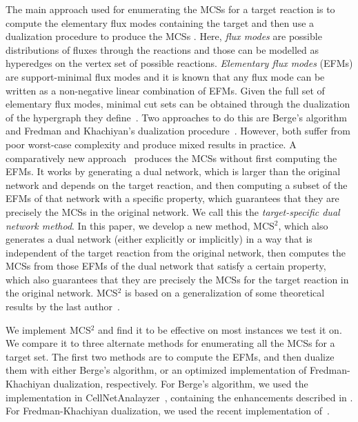 \documentclass{bioinfo}
\theoremstyle{plain}
\theoremstyle{definition}
\begin{document}
The main approach used for enumerating the MCSs for a target reaction is to compute the elementary flux modes containing the target and then use a dualization procedure to produce the MCSs \cite{MHS-survey}.  %
Here, \emph{flux modes} are possible distributions of fluxes through the reactions and those can be modelled as hyperedges on the vertex set of possible reactions. \emph{Elementary flux modes} (EFMs) are support-minimal flux modes and it is known that any flux mode can be written as a non-negative linear combination of EFMs. Given the full set of elementary flux modes, minimal cut sets can be obtained through the dualization of the hypergraph they define~\cite{MCS,Stephen}. Two approaches to do this are Berge's algorithm~\cite{Berge} and Fredman and Khachiyan's dualization procedure~\cite{FK}. However, both suffer from poor worst-case complexity and produce mixed results in practice. A comparatively new approach~\cite{Duality} produces the MCSs without first computing the EFMs. It works by generating a dual network, which is larger than the original network and depends on the target reaction, and then computing a subset of the EFMs of that network with a specific property, which guarantees that they are precisely the MCSs in the original network. We call this the \textit{target-specific dual network method}. In this paper, we develop a new method, MCS$^2$, which also generates a dual network (either explicitly or implicitly) in a way that is independent of the target reaction from the original network, then computes the MCSs from those EFMs of the dual network that satisfy a certain property, which also guarantees that they are precisely the MCSs for the target reaction in the original network. MCS$^2$ is based on a generalization of some theoretical results by the last author~\cite{Thesis}.

We implement MCS$^{2}$ and find it to be effective on most instances we test it on. We compare it to three alternate methods for enumerating all the MCSs for a target set.
The first two methods are to compute the EFMs, and then dualize them with either Berge's algorithm, or an optimized implementation of Fredman-Khachiyan dualization, respectively. For Berge's algorithm, we used the implementation in CellNetAnalayzer~\cite{Cellnet}, containing the enhancements described in \cite{Stephen, Dualization}. For Fredman-Khachiyan dualization, we used the recent implementation of~\cite{Nafiseh}. 
\end{document}
